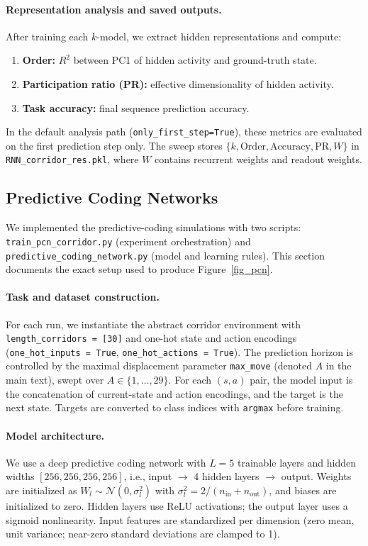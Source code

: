 \documentclass{article}
\begin{document}
\paragraph{Representation analysis and saved outputs.}
After training each \(k\)-model, we extract hidden representations and compute:
\begin{enumerate}
\item \textbf{Order:} \(R^2\) between PC1 of hidden activity and ground-truth state.
\item \textbf{Participation ratio (PR):} effective dimensionality of hidden activity.
\item \textbf{Task accuracy:} final sequence prediction accuracy.
\end{enumerate}
In the default analysis path (\texttt{only\_first\_step=True}), these metrics are evaluated on
the first prediction step only. The sweep stores
\(\{k, \mathrm{Order}, \mathrm{Accuracy}, \mathrm{PR}, W\}\) in
\texttt{RNN\_corridor\_res.pkl}, where \(W\) contains recurrent weights and readout weights.
\subsection{Predictive Coding Networks}
\label{sec:appendix_pcn_details}
We implemented the predictive-coding simulations with two scripts:
\texttt{train\_pcn\_corridor.py} (experiment orchestration) and
\texttt{predictive\_coding\_network.py} (model and learning rules).
This section documents the exact setup used to produce Figure~\ref{fig_pcn}.

\paragraph{Task and dataset construction.}
For each run, we instantiate the abstract corridor environment with
\texttt{length\_corridors = [30]} and one-hot state and action encodings
(\texttt{one\_hot\_inputs = True}, \texttt{one\_hot\_actions = True}).
The prediction horizon is controlled by the maximal displacement parameter
\texttt{max\_move} (denoted \(A\) in the main text), swept over
\(A \in \{1,\dots,29\}\).
For each \((s,a)\) pair, the model input is the concatenation of current-state and action encodings,
and the target is the next state. Targets are converted to class indices with
\texttt{argmax} before training.

\paragraph{Model architecture.}
We use a deep predictive coding network with \(L=5\) trainable layers and hidden widths
\([256,256,256,256]\), i.e., input \(\rightarrow\) 4 hidden layers \(\rightarrow\) output.
Weights are initialized as \(W_l \sim \mathcal{N}(0, \sigma_l^2)\) with
\(\sigma_l^2 = 2/(n_{\mathrm{in}}+n_{\mathrm{out}})\), and biases are initialized to zero.
Hidden layers use ReLU activations; the output layer uses a sigmoid nonlinearity.
Input features are standardized per dimension (zero mean, unit variance; near-zero standard
deviations are clamped to 1).
\end{document}
